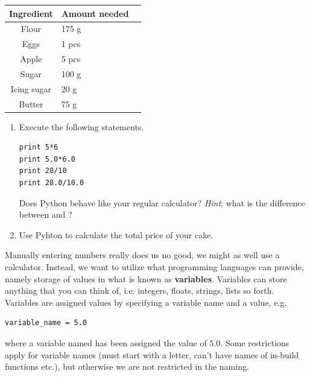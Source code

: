 \documentclass{article}
\begin{document}
\begin{center}
    \begin{tabular}{c l l}
    \hline
    Ingredient & Amount needed\\
    \hline
    Flour & 175 g \\
    Eggs & 1 pcs \\
    Apple & 5 pcs \\
    Sugar & 100 g \\
    Icing sugar &  20 g \\
    Butter & 75 g \\
    \end{tabular}
\end{center}

\begin{enumerate}[resume]

    \item Execute the following statements.
\begin{lstlisting}
print 5*6
print 5.0*6.0
print 28/10
print 28.0/10.0
\end{lstlisting}
    Does Python behave like your regular calculator?
    {\em Hint}; what is the difference between {} and {}? 

    \item Use Pyhton to calculate the total price of your cake.
 
\end{enumerate}


Manually entering numbers really does us no good, we might as well use a calculator.
Instead, we want to utilize what programming languages can provide,
namely storage of values in what is known as {\bf variables}.
Variables can store anything that you can think of, i.e. integers, floats, strings, lists so forth.
Variables are assigned values by specifying a variable name and a value, e.g.

\begin{lstlisting}
variable_name = 5.0
\end{lstlisting}

where a variable named  has been assigned the value
of $5.0$.
Some restrictions apply for variable names (must start with a letter, can't have names of in-build functions etc.), but otherwise we are not restricted in the naming.\\
\end{document}
